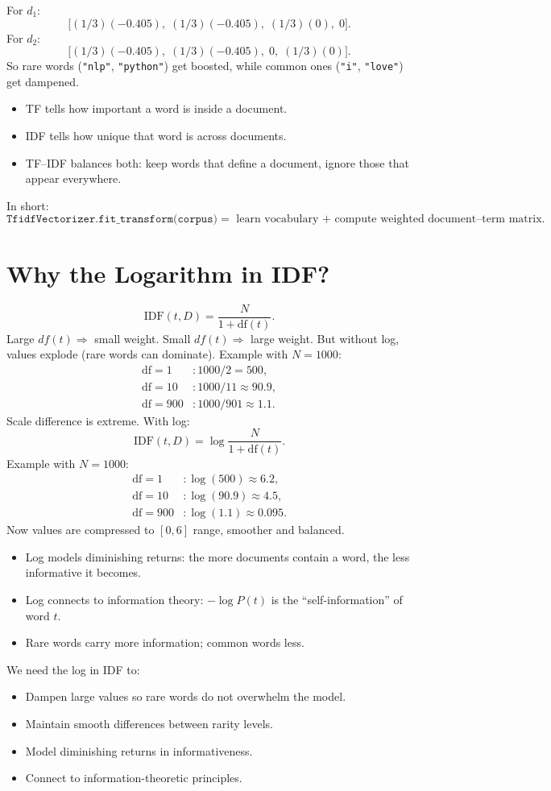 For $d_1$:
\[
\big[ (1/3)(-0.405), \; (1/3)(-0.405), \; (1/3)(0), \; 0 \big].
\]
For $d_2$:
\[
\big[ (1/3)(-0.405), \; (1/3)(-0.405), \; 0, \; (1/3)(0) \big].
\]
So rare words (\texttt{"nlp"}, \texttt{"python"}) get boosted, while common ones (\texttt{"i"}, \texttt{"love"}) get dampened.
\begin{itemize}
	\item TF tells how important a word is inside a document.
	\item IDF tells how unique that word is across documents.
	\item TF--IDF balances both: keep words that define a document, ignore those that appear everywhere.
\end{itemize}
In short:
\[
\texttt{TfidfVectorizer.fit\_transform(corpus)} 
= \text{ learn vocabulary + compute weighted document--term matrix}.
\]

\section{Why the Logarithm in IDF?}

\[
\mathrm{IDF}(t,D) = \frac{N}{1 + \mathrm{df}(t)}.
\]
Large $df(t) \Rightarrow$ small weight. Small $df(t) \Rightarrow$ large weight. But without log, values explode (rare words can dominate). Example with $N=1000$:
\[
\begin{aligned}
	\mathrm{df}=1 &: 1000/2 = 500, \\
	\mathrm{df}=10 &: 1000/11 \approx 90.9, \\
	\mathrm{df}=900 &: 1000/901 \approx 1.1.
\end{aligned}
\]
Scale difference is extreme. With log:
\[
\mathrm{IDF}(t,D) = \log \frac{N}{1+\mathrm{df}(t)}.
\]
Example with $N=1000$:
\[
\begin{aligned}
	\mathrm{df}=1 &: \log(500) \approx 6.2, \\
	\mathrm{df}=10 &: \log(90.9) \approx 4.5, \\
	\mathrm{df}=900 &: \log(1.1) \approx 0.095.
\end{aligned}
\]
Now values are compressed to $[0,6]$ range, smoother and balanced.
\begin{itemize}
	\item Log models diminishing returns: the more documents contain a word, the less informative it becomes.
	\item Log connects to information theory: $-\log P(t)$ is the ``self-information'' of word $t$.
	\item Rare words carry more information; common words less.
\end{itemize}
We need the log in IDF to:
\begin{itemize}
	\item Dampen large values so rare words do not overwhelm the model.
	\item Maintain smooth differences between rarity levels.
	\item Model diminishing returns in informativeness.
	\item Connect to information-theoretic principles.
\end{itemize}